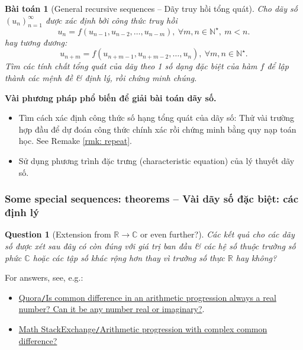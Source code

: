 \documentclass{article}
\newtheorem{baitoan}{Bài toán}
\newtheorem{question}{Question}
\begin{document}
\begin{baitoan}[General recursive sequences -- Dãy truy hồi tổng quát]
	Cho dãy số $(u_n)_{n=1}^\infty$ được xác định bởi công thức truy hồi
	\begin{equation}
		\boxed{u_n = f(u_{n-1},u_{n-2},\ldots,u_{n-m}),\ \forall m,n\in\mathbb{N}^\star,\ m < n.}
	\end{equation}
	hay tương đương:
	\begin{equation*}
		\boxed{u_{n + m} = f(u_{n + m - 1},u_{n+m-2},\ldots,u_n),\ \forall m,n\in\mathbb{N}^\star.}
	\end{equation*}
	Tìm các tính chất tổng quát của dãy theo 1 số dạng đặc biệt của hàm $f$ để lập thành các mệnh đề \& định lý, rồi chứng minh chúng.
\end{baitoan}
\textbf{\textsf{Vài phương pháp phổ biến để giải bài toán dãy số.}}
\begin{itemize}
	\item Tìm cách xác định công thức số hạng tổng quát của dãy số: Thử vài trường hợp đầu để dự đoán công thức chính xác rồi chứng minh bằng quy nạp toán học. See Remake \ref{rmk: repeat}.
	\item Sử dụng phương trình đặc trưng (characteristic equation) của lý thuyết dãy số.
\end{itemize}


\subsubsection{Some special sequences: theorems -- Vài dãy số đặc biệt: các định lý}

\begin{question}[Extension from $\mathbb{R}\to\mathbb{C}$ or even further?]
	Các kết quả cho các dãy số được xét sau đây có còn đúng với giá trị ban đầu \& các hệ số thuộc trường số phức $\mathbb{C}$ hoặc các tập số khác rộng hơn thay vì trường số thực $\mathbb{R}$ hay không?
\end{question}
For answers, see, e.g.:
\begin{itemize}
	\item \href{https://www.quora.com/Is-common-difference-in-an-arithmetic-progression-always-a-real-number-Can-it-be-any-number-real-or-imaginary}{Quora{\tt/}Is common difference in an arithmetic progression always a real number? Can it be any number real or imaginary?}.
	\item \href{https://math.stackexchange.com/questions/1299820/arithmetic-progression-with-complex-common-difference}{Math StackExchange{\tt/}Arithmetic progression with complex common difference?}
\end{itemize}
\end{document}
